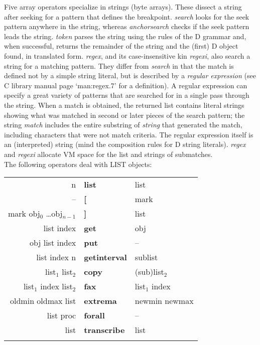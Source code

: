 Five array operators specialize in strings (byte arrays).  These dissect  a string after seeking for a pattern that defines the  breakpoint. \emph{search} looks for the seek pattern anywhere in the string, whereas \emph{anchorsearch} checks if the seek pattern leads the string. \emph{token} parses the string using the rules of the D grammar and, when successful, returns the remainder of the string and the (first) D object found, in translated form. \emph{regex}, and its case-insensitive kin \emph{regexi}, also search a string for a matching pattern. They differ from \emph{search} in that the match is defined not by a simple string literal, but is described by a \emph{regular expression} (see C library manual page `man:regex.7' for a definition). A regular expression can specify a great variety of patterns that are searched for in a single pass through the string. When a match is obtained, the returned list contains literal strings showing what was matched in second or later pieces of the search pattern; the string \emph{match} includes the entire substring of \emph{string} that generated the match, including characters that were not match criteria. The regular expression itself is an (interpreted) string (mind the composition rules for D string literals). \emph{regex} and \emph{regexi} allocate VM space for the list and strings of submatches.\\


\noindent The following operators deal with LIST objects:

\begin{supertabular}{>{\sffamily}r>{\sffamily\bfseries}l>{\sffamily}l}
n                               & list        & list\\
--                              & [           & mark\\
mark obj$_0$ \ldots obj$_{n-1}$ & ]           & list\\
list index                      & get         & obj\\
obj list index                  & put         & --\\
list index n                    & getinterval & sublist\\
list$_1$ list$_2$               & copy        & (sub)list$_2$\\
list$_1$ index list$_2$         & fax         & list$_1$ index\\
oldmin oldmax list              & extrema     & newmin newmax\\
list proc                       & forall      & --\\
list                            & transcribe  & list\\\\
\end{supertabular}

